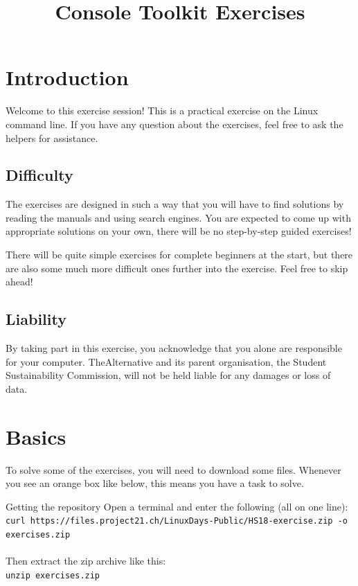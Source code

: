 \documentclass{TheAlternativeCourse}
\title{Console Toolkit Exercises}
\date{}
\author{}
\begin{document}
\maketitle

\setlength{\parindent}{0cm}
\setlength{\parskip}{12pt}

\section{Introduction}

Welcome to this exercise session! This is a practical exercise on the Linux
command line.  If you have any question about the exercises, feel free to ask
the helpers for assistance.

\subsection*{Difficulty}

The exercises are designed in such a way that you will have to find solutions
by reading the manuals and using search engines. You are expected to come up
with appropriate solutions on your own, there will be no step-by-step guided
exercises!

There will be quite simple exercises for complete beginners at the start,
but there are also some much more difficult ones further into the exercise.
Feel free to skip ahead!

\subsection*{Liability}

By taking part in this exercise, you acknowledge that you alone are responsible
for your computer. TheAlternative and its parent organisation, the Student
Sustainability Commission, will not be held liable for any damages or loss of
data.

\pagebreak

\section{Basics}

To solve some of the exercises, you will need to download some files. Whenever
you see an orange box like below, this means you have a task to solve.

\begin{exercisebox}{Getting the repository}
    Open a terminal and enter the following (all on one line): \\
    \texttt{curl https://files.project21.ch/LinuxDays-Public/HS18-exercise.zip
        -o exercises.zip} \\\\
    Then extract the zip archive like this: \\
    \texttt{unzip exercises.zip}
\end{exercisebox}
\end{document}
